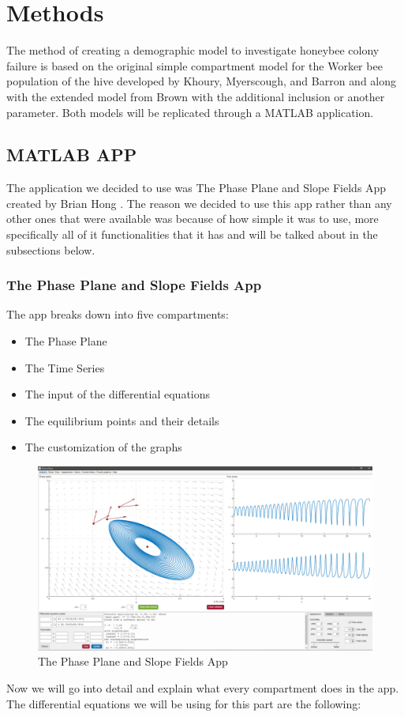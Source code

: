 \documentclass[a4paper,10pt]{article}
\begin{document}
\section{Methods}
The method of creating a demographic model to investigate honeybee colony failure is based on the original simple compartment model for the Worker bee population of the hive developed by Khoury, Myerscough, and Barron \cite{Kho} and along with the extended model from Brown \cite{Brown} with the additional inclusion or another parameter. Both models will be replicated through a MATLAB application.
\subsection{MATLAB APP}
The application we decided to use was The Phase Plane and Slope Fields App created by Brian Hong \cite{Brian}. The reason we decided to use this app rather than any other ones that were available was because of how simple it was to use, more specifically all of it functionalities that it has and will be talked about in the subsections below.
\subsubsection{The Phase Plane and Slope Fields App}
The app breaks down into five compartments:
\begin{itemize}
\item The Phase Plane
\item The Time Series
\item The input of the differential equations
\item The equilibrium points and their details
\item The customization of the graphs
\end{itemize}
\begin{figure}[H]
	\centering
	\includegraphics[width=16cm]{Project_App.png}
	\caption{The Phase Plane and Slope Fields App}
\end{figure}
Now we will go into detail and explain what every compartment does in the app.\\
The differential equations we will be using for this part are the following: 
\end{document}
